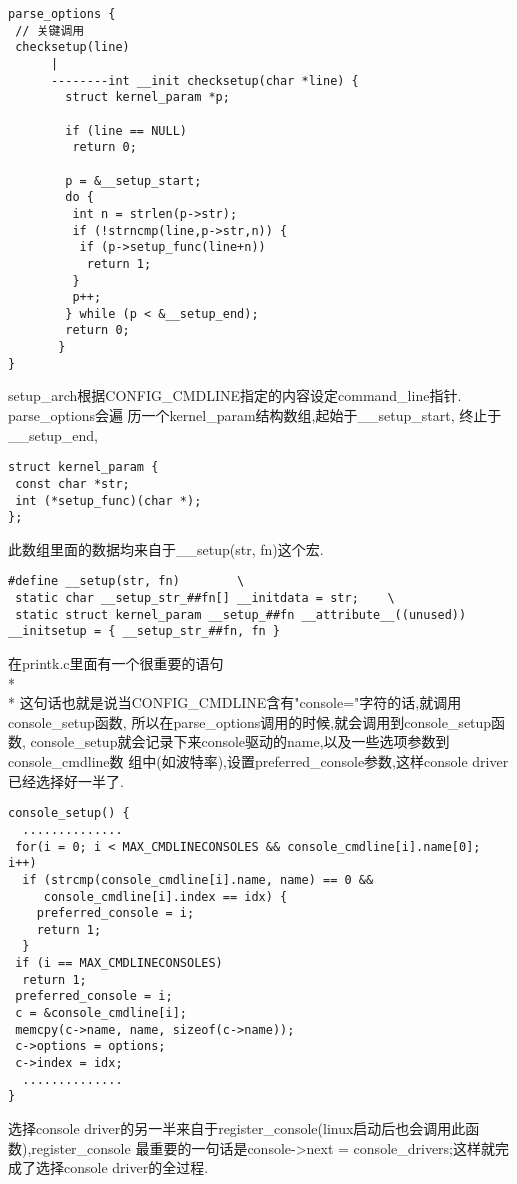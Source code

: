 \documentclass[a4paper,titlepage]{article}
\begin{document}
\begin{enumerate}
\begin{lstlisting}
parse_options {
 // 关键调用
 checksetup(line)
      |
      --------int __init checksetup(char *line) {
        struct kernel_param *p;
       
        if (line == NULL)
         return 0;
       
        p = &__setup_start;
        do {
         int n = strlen(p->str);
         if (!strncmp(line,p->str,n)) {
          if (p->setup_func(line+n))
           return 1;
         }
         p++;
        } while (p < &__setup_end);
        return 0;
       }
}
\end{lstlisting}

setup_arch根据CONFIG_CMDLINE指定的内容设定command_line指针. parse_options会遍
历一个kernel_param结构数组,起始于__setup_start, 终止于__setup_end,

\begin{lstlisting}
struct kernel_param {
 const char *str;
 int (*setup_func)(char *);
};
\end{lstlisting}
此数组里面的数据均来自于__setup(str, fn)这个宏.
\begin{lstlisting}[caption=Init.h]
#define __setup(str, fn)        \
 static char __setup_str_##fn[] __initdata = str;    \
 static struct kernel_param __setup_##fn __attribute__((unused)) __initsetup = { __setup_str_##fn, fn }
\end{lstlisting}

在printk.c里面有一个很重要的语句
\\*\\*
这句话也就是说当CONFIG_CMDLINE含有"console="字符的话,就调用
console_setup函数, 所以在parse_options调用的时候,就会调用到console_setup函数,
console_setup就会记录下来console驱动的name,以及一些选项参数到console_cmdline数
组中(如波特率),设置preferred_console参数,这样console driver已经选择好一半了.

\begin{lstlisting}
console_setup() {
  ..............  
 for(i = 0; i < MAX_CMDLINECONSOLES && console_cmdline[i].name[0]; i++)
  if (strcmp(console_cmdline[i].name, name) == 0 &&
     console_cmdline[i].index == idx) {
    preferred_console = i;
    return 1;
  }
 if (i == MAX_CMDLINECONSOLES)
  return 1;
 preferred_console = i;
 c = &console_cmdline[i];
 memcpy(c->name, name, sizeof(c->name));
 c->options = options;
 c->index = idx; 
  ..............
}
\end{lstlisting}

选择console driver的另一半来自于register_console(linux启动后也会调用此函数),register_console
最重要的一句话是console->next = console_drivers;这样就完成了选择console driver的全过程.


\end{enumerate}
\end{document}
